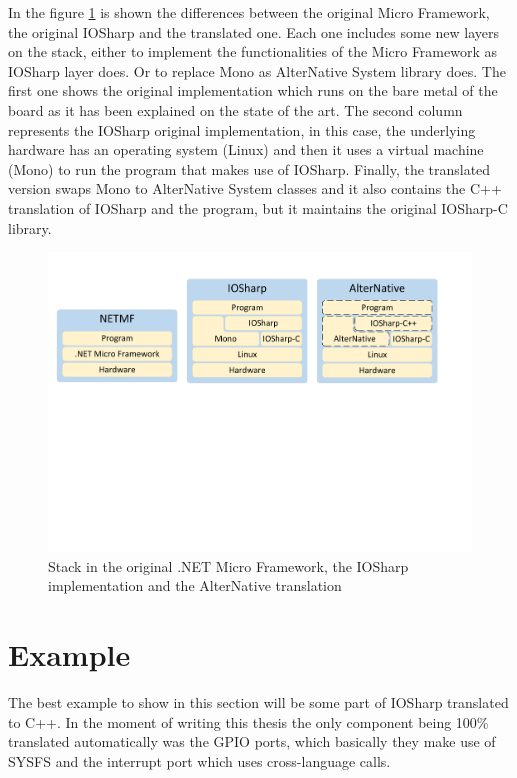 In the figure \ref{fig:AN-Example-IOSharp} is shown the differences between the original Micro Framework, the original IOSharp and the translated one. Each one includes some new layers on the stack, either to implement the functionalities of the Micro Framework as IOSharp layer does. Or to replace Mono as AlterNative System library does. The first one shows the original implementation which runs on the bare metal of the board as it has been explained on the state of the art. The second column represents the IOSharp original implementation, in this case, the underlying hardware has an operating system (Linux) and then it uses a virtual machine (Mono) to run the program that makes use of IOSharp. Finally, the translated version swaps Mono to AlterNative System classes and it also contains the C++ translation of IOSharp and the program, but it maintains the original IOSharp-C library.

\begin{figure}[H]\begin{center}
 \centering
  \captionsetup{justification=centering}
  \includegraphics[width=1\textwidth]{pictures/alternative/transformations-iosharp}
  \caption{Stack in the original .NET Micro Framework, the IOSharp implementation and the AlterNative translation\label{fig:AN-Example-IOSharp}}
\end{center}\end{figure}

\section{Example}\label{SS:AN-Process-Example}
The best example to show in this section will be some part of IOSharp translated to C++. In the moment of writing this thesis the only component being 100\% translated automatically was the GPIO ports, which basically they make use of \gls{SYSFS} and the interrupt port which uses cross-language calls.

